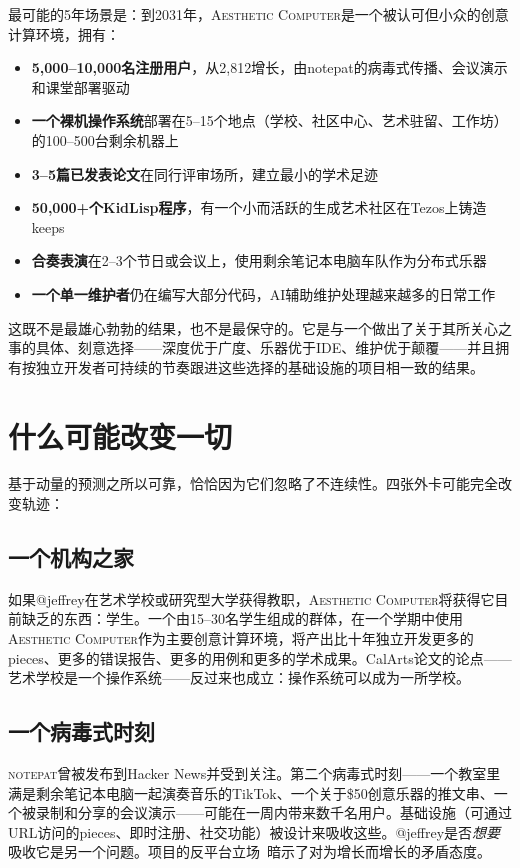 \documentclass[10pt,letterpaper,twocolumn]{article}
\newcommand{\ac}{\textsc{Aesthetic Computer}}
\newcommand{\np}{\textsc{notepat}}
\begin{document}
最可能的5年场景是：到2031年，\ac{}是一个被认可但小众的创意计算环境，拥有：

\begin{itemize}
  \item \textbf{5,000--10,000名注册用户}，从2,812增长，由notepat的病毒式传播、会议演示和课堂部署驱动
  \item \textbf{一个裸机操作系统}部署在5--15个地点（学校、社区中心、艺术驻留、工作坊）的100--500台剩余机器上
  \item \textbf{3--5篇已发表论文}在同行评审场所，建立最小的学术足迹
  \item \textbf{50,000+个KidLisp程序}，有一个小而活跃的生成艺术社区在Tezos上铸造keeps
  \item \textbf{合奏表演}在2--3个节日或会议上，使用剩余笔记本电脑车队作为分布式乐器
  \item \textbf{一个单一维护者}仍在编写大部分代码，AI辅助维护处理越来越多的日常工作
\end{itemize}

这既不是最雄心勃勃的结果，也不是最保守的。它是与一个做出了关于其所关心之事的具体、刻意选择——深度优于广度、乐器优于IDE、维护优于颠覆——并且拥有按独立开发者可持续的节奏跟进这些选择的基础设施的项目相一致的结果。


\section{什么可能改变一切}
\label{sec:wildcards}

基于动量的预测之所以可靠，恰恰因为它们忽略了不连续性。四张外卡可能完全改变轨迹：

\subsection{一个机构之家}

如果@jeffrey在艺术学校或研究型大学获得教职，\ac{}将获得它目前缺乏的东西：学生。一个由15--30名学生组成的群体，在一个学期中使用\ac{}作为主要创意计算环境，将产出比十年独立开发更多的pieces、更多的错误报告、更多的用例和更多的学术成果。CalArts论文的论点——艺术学校是一个操作系统——反过来也成立：操作系统可以成为一所学校。

\subsection{一个病毒式时刻}

\np{}曾被发布到Hacker News并受到关注。第二个病毒式时刻——一个教室里满是剩余笔记本电脑一起演奏音乐的TikTok、一个关于\$50创意乐器的推文串、一个被录制和分享的会议演示——可能在一周内带来数千名用户。基础设施（可通过URL访问的pieces、即时注册、社交功能）被设计来吸收这些。@jeffrey是否\emph{想要}吸收它是另一个问题。项目的反平台立场~\citep{fisher2009capitalist}暗示了对为增长而增长的矛盾态度。
\end{document}
